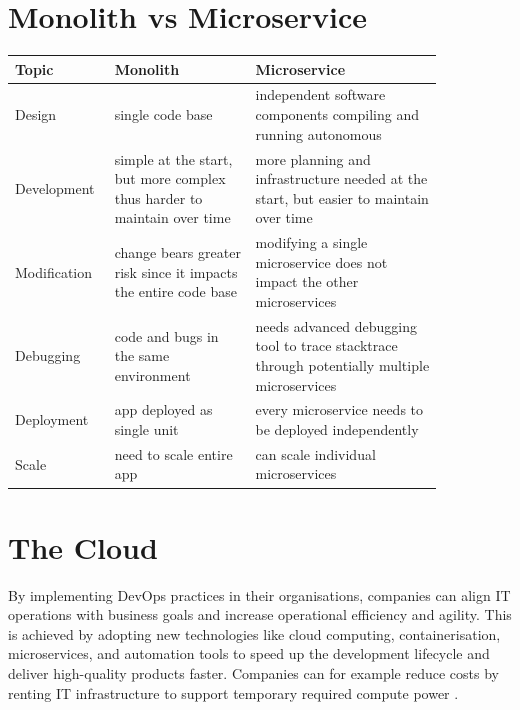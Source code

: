 \documentclass[BIF,Bachelor,nenglish]{twbook}%
\begin{document}
\section{Monolith vs Microservice}
\begin{table}[!h]
    \centering
    \begin{tabular}{|p{0.15\linewidth}|p{0.3\linewidth}|p{0.4\linewidth}|}
    \hline
        \textbf{Topic} & \textbf{Monolith} & \textbf{Microservice} \\ \hline
        Design & single code base & independent software components compiling and running autonomous \\ \hline
        Development & simple at the start, but more complex thus harder to maintain over time & more planning and infrastructure needed at the start, but easier to maintain over time \\ \hline
        Modification & change bears greater risk since it impacts the entire code base & modifying a single microservice does not impact the other microservices \\ \hline
        Debugging & code and bugs in the same environment & needs advanced debugging tool to trace stacktrace through potentially multiple microservices \\ \hline
        Deployment & app deployed as single unit & every microservice needs to be deployed independently \\ \hline
        Scale & need to scale entire app & can scale individual microservices \\ \hline
    \end{tabular}
\end{table}

\section{The Cloud}
By implementing DevOps practices in their organisations, companies can align IT operations with business goals and increase operational efficiency and agility. This is achieved by adopting new technologies like cloud computing, containerisation, microservices, and automation tools to speed up the development lifecycle and deliver high-quality products faster. Companies can for example reduce costs by renting IT infrastructure to support temporary required compute power \cite{qia2009}.
\end{document}
